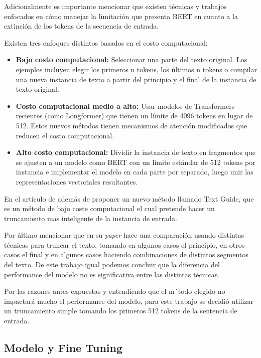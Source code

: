 Adicionalmente es importante mencionar que existen técnicas y trabajos enfocados en cómo manejar la limitación que presenta BERT en cuanto a la extinción de los tokens de la secuencia de entrada. 

Existen tres enfoques distintos basados en el costo computacional:
\begin{itemize}
    \item \textbf{Bajo costo computacional:} Seleccionar una parte del texto original. Los ejemplos incluyen elegir los primeros n tokens, los últimos n tokens o compilar una nueva instancia de texto a partir del principio y el final de la instancia de texto original.
    \item \textbf{Costo computacional medio a alto:} Usar modelos de Transformers recientes (como Longformer) que tienen un límite de 4096 tokens en lugar de 512. Estos nuevos métodos tienen mecanismos de atención modificados que reducen el costo computacional.
    \item \textbf{Alto costo computacional:} Dividir la instancia de texto en fragmentos que se ajusten a un modelo como BERT con un límite estándar de 512 tokens por instancia e implementar el modelo en cada parte por separado, luego unir las representaciones vectoriales resultantes.
\end{itemize}

En el artículo de \cite{Fiok_2021_TextGuideLong} además de proponer un nuevo método llamado Text Guide, que es un método de bajo coste computacional el cual pretende hacer un truncamiento mas inteligente de la instancia de entrada.

Por último mencionar que \cite{FTBERTCLAS_https://doi.org/10.48550/arxiv.1905.05583} en su \textit{paper} hace una comparación usando distintas técnicas para truncar el texto, tomando en algunos casos el principio, en otros casos el final y en algunos casos haciendo combinaciones de distintos segmentos del texto. De este trabajo igual podemos concluir que la diferencia del performance del modelo no es significativa entre las distintas técnicas. 

Por las razones antes expuestas y entendiendo que el m´todo elegido no impactará mucho el performance del modelo,  para este trabajo se decidió utilizar un truncamiento simple tomando los primeros 512 tokens de la sentencia de entrada.



\subsection{Modelo y Fine Tuning}
\label{as-finetunning}

